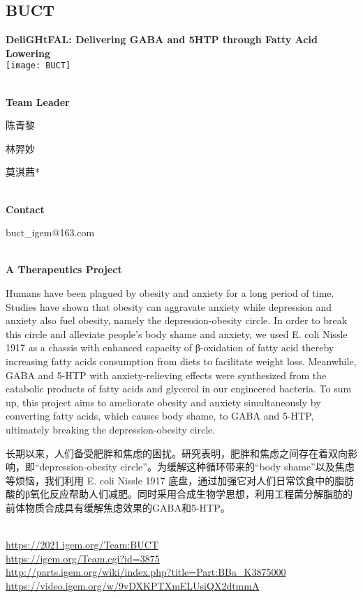 

\subsection{\textcolor{Blu}{ BUCT } }
\vspace{5mm}
\begin{center}
\large{
  \textbf{ DeliGHtFAL: Delivering GABA and 5HTP through Fatty Acid Lowering }\\
  \texttt{[image: BUCT]}
}
\end{center}
\textbf{\\Team Leader}

  陈青黎

  林羿妙

  莫淇茜*


\textbf{\\Contact}

  buct\_igem@163.com


\textbf{\\A Therapeutics Project\\}\begin{spacing}{1.5}

Humans have been plagued by obesity and anxiety for a long period of time. Studies have shown that obesity can aggravate anxiety while depression and anxiety also fuel obesity, namely the depression-obesity circle. In order to break this circle and alleviate people’s body shame and anxiety, we used E. coli Nissle 1917 as a chassis with enhanced capacity of β-oxidation of fatty acid thereby increasing fatty acids consumption from diets to facilitate weight loss. Meanwhile, GABA and 5-HTP with anxiety-relieving effects were synthesized from the catabolic products of fatty acids and glycerol in our engineered bacteria. To sum up, this project aims to ameliorate obesity and anxiety simultaneously by converting fatty acids, which causes body shame, to GABA and 5-HTP, ultimately breaking the depression-obesity circle.

长期以来，人们备受肥胖和焦虑的困扰。研究表明，肥胖和焦虑之间存在着双向影响，即“depression-obesity circle”。为缓解这种循环带来的“body shame”以及焦虑等烦恼，我们利用 E. coli Nissle 1917 底盘，通过加强它对人们日常饮食中的脂肪酸的β氧化反应帮助人们减肥。同时采用合成生物学思想，利用工程菌分解脂肪的前体物质合成具有缓解焦虑效果的GABA和5-HTP。\end{spacing}
\\

\url{https://2021.igem.org/Team:BUCT }\\
\url{https://igem.org/Team.cgi?id=3875 }\\
\url{http://parts.igem.org/wiki/index.php?title=Part:BBa_K3875000 }\\
\url{https://video.igem.org/w/9vDXKPTXmELUsiQX2dtmmA }\\

